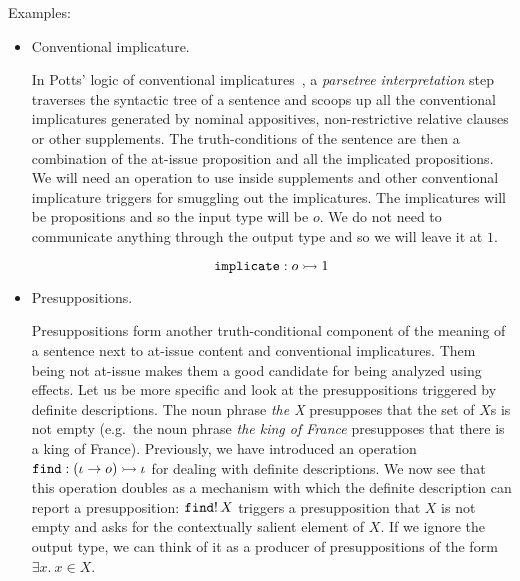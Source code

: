 Examples:

\begin{itemize}
\item Conventional implicature.
  
  In Potts' logic of conventional implicatures~\cite{potts2005logic}, a
  \emph{parsetree interpretation} step traverses the syntactic tree of a
  sentence and scoops up all the conventional implicatures generated by
  nominal appositives, non-restrictive relative clauses or other
  supplements. The truth-conditions of the sentence are then a combination
  of the at-issue proposition and all the implicated propositions. We will
  need an operation to use inside supplements and other conventional
  implicature triggers for smuggling out the implicatures. The implicatures
  will be propositions and so the input type will be $o$. We do not need to
  communicate anything through the output type and so we will leave it at
  $1$.

  $$
  \mathtt{implicate} : o \rightarrowtail 1
  $$

\item Presuppositions.

  Presuppositions form another truth-conditional component of the meaning
  of a sentence next to at-issue content and conventional
  implicatures. Them being not at-issue makes them a good candidate for
  being analyzed using effects. Let us be more specific and look at the
  presuppositions triggered by definite descriptions. The noun phrase
  \emph{the X} presupposes that the set of $X$s is not empty (e.g.\ the
  noun phrase \emph{the king of France} presupposes that there is a king of
  France). Previously, we have introduced an operation
  $\mathtt{find} : (\iota \to o) \rightarrowtail \iota$ for dealing with definite
  descriptions. We now see that this operation doubles as a mechanism with
  which the definite description can report a presupposition:
  $\mathtt{find}!\,X$ triggers a presupposition that $X$ is not empty and
  asks for the contextually salient element of $X$. If we ignore the output
  type, we can think of it as a producer of presuppositions of the form
  $\exists x.\ x \in X$.
\end{itemize}

